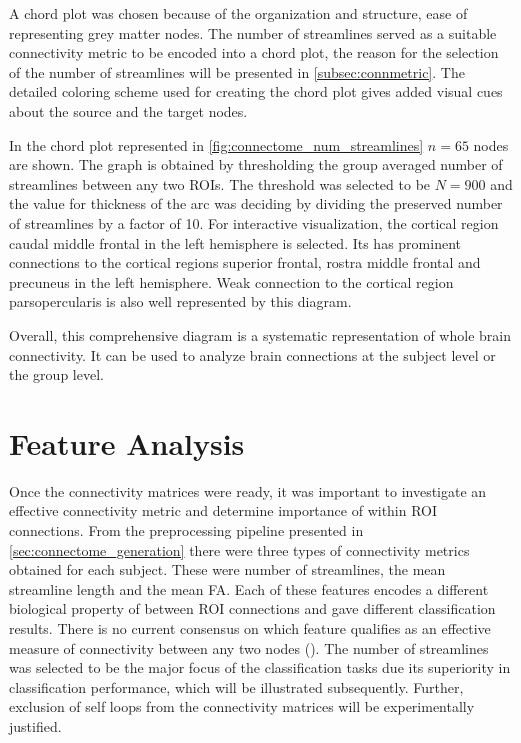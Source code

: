\documentclass[msthesis.tex]{subfiles}
\begin{document}
A chord plot was chosen because of the organization and structure, ease of representing grey matter nodes. The number of streamlines served as a suitable connectivity metric to be encoded into a chord plot, the reason for the selection of the number of streamlines will be presented in \autoref{subsec:connmetric}. The detailed coloring scheme used for creating the chord plot gives added visual cues about the source and the target nodes.

In the chord plot represented in \autoref{fig:connectome_num_streamlines} $n=65$ nodes are shown. The graph is obtained by thresholding the group averaged number of streamlines between any two ROIs. The threshold was selected to be $N=900$ and the value for thickness of the arc was deciding by dividing the preserved number of streamlines by a factor of 10. For interactive visualization, the cortical region caudal middle frontal in the left hemisphere is selected. Its has prominent connections to the cortical regions superior frontal, rostra middle frontal and precuneus in the left hemisphere. Weak connection to the cortical region parsopercularis is also well represented by this diagram. 

Overall, this comprehensive diagram is a systematic representation of whole brain connectivity. It can be used to analyze brain connections at the subject level or the group level.

\section{Feature Analysis}

Once the connectivity matrices were ready, it was important to investigate an effective connectivity metric and determine importance of within ROI connections. From the preprocessing pipeline presented in \autoref{sec:connectome_generation} there were three types of connectivity metrics obtained for each subject. These were number of streamlines, the mean streamline length and the mean FA. Each of these features encodes a different biological property of between ROI connections and gave different classification results. There is no current consensus on which feature qualifies as an effective measure of connectivity between any two nodes (\cite{yeh2020mapping}). The number of streamlines was selected to be the major focus of the classification tasks due its superiority in classification performance, which will be illustrated subsequently. Further, exclusion of self loops from the connectivity matrices will be experimentally justified. 
\end{document}
